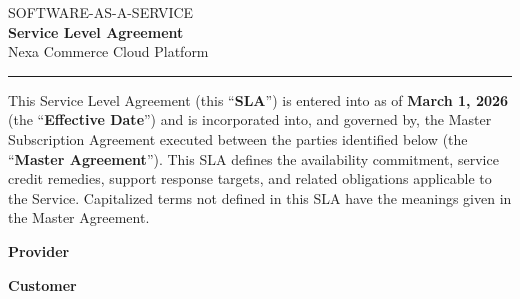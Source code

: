 \thispagestyle{firstpage}

\begin{center}
  {\sffamily\color{slateink}\small SOFTWARE-AS-A-SERVICE}\\[2pt]
  {\sffamily\bfseries\Huge\color{nexanavy} Service Level Agreement}\\[6pt]
  {\sffamily\large\color{nexateal} Nexa Commerce Cloud Platform}\\[10pt]
  {\color{nexateal}\rule{0.55\linewidth}{1pt}}
\end{center}

\vspace{6pt}

This Service Level Agreement (this ``\textbf{SLA}'') is entered into as of \textbf{March 1, 2026} (the ``\textbf{Effective Date}'') and is incorporated into, and governed by, the Master Subscription Agreement executed between the parties identified below (the ``\textbf{Master Agreement}''). This SLA defines the availability commitment, service credit remedies, support response targets, and related obligations applicable to the Service. Capitalized terms not defined in this SLA have the meanings given in the Master Agreement.

\vspace{4pt}

\noindent
\begin{minipage}[t]{0.48\linewidth}
\begin{partybox}
{\sffamily\bfseries\color{nexanavy} Provider}\\[4pt]
\end{partybox}
\end{minipage}\hfill
\begin{minipage}[t]{0.48\linewidth}
\begin{partybox}
{\sffamily\bfseries\color{nexanavy} Customer}\\[4pt]
\end{partybox}
\end{minipage}
\par
\vspace{6pt}

